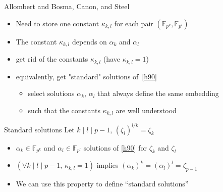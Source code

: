 \documentclass[xcolor=x11names,compress, aspectratio=43]{beamer}
\begin{document}
\begin{frame}{Allombert and Bosma, Canon, and Steel}
  \begin{itemize}
    \item Need to store one constant $\kappa_{k, l}$ for each pair
      $(\mathbb{F}_{p^k}, \mathbb{F}_{p^l})$
    \item The constant $\kappa_{k, l}$ depends on $\alpha_k$ and $\alpha_l$
  \end{itemize}
  \begin{itemize}
    \item get rid of the constants $\kappa_{k, l}$ (\eg have $\kappa_{k, l}=1$)
    \item equivalently, get "standard" solutions of~\eqref{h90}
      \begin{itemize}
        \item select solutions $\alpha_k$, $\alpha_l$ that always define the
          same embedding
        \item such that the constants $\kappa_{k, l}$ are well understood
      \end{itemize}
  \end{itemize}
\end{frame}

\begin{frame}{Standard solutions}
  Let $k\mid l\mid p-1$, $(\zeta_l)^{l/k}=\zeta_k$
  \begin{itemize}
    \item $\alpha_k\in\mathbb{F}_{p^k}$ and $\alpha_l\in\mathbb{F}_{p^l}$
      solutions of \eqref{h90} for $\zeta_k$ and $\zeta_l$
    \item $(\forall k\mid l\mid p-1,\, \kappa_{k, l} = 1)$ implies $(\alpha_k)^k =
      (\alpha_l)^l=\zeta_{p-1}$
    \item We can use this property to define ``standard solutions''
  \end{itemize}
\end{frame}
\end{document}
